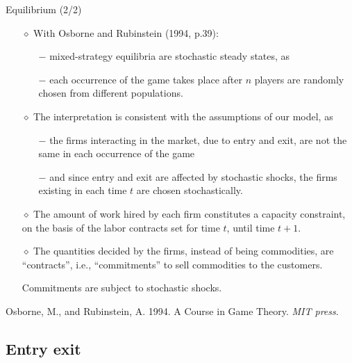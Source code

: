 \documentclass[9pt]{beamer}
\begin{document}
\begin{frame}{Equilibrium (2/2)}

\begin{itemize}

\item[$\diamond$] With Osborne and Rubinstein (1994, p.39):
\begin{itemize}
\item[$-$] mixed-strategy equilibria are stochastic steady states, as
\item[$-$] each occurrence of the game takes place after $n$ players are randomly chosen from different populations. 
\end{itemize}

\item[$\diamond$] The interpretation is consistent with the assumptions of our model, as 
\begin{itemize}
\item[$-$]  the firms interacting in the market, due to entry and exit, are
not the same in each occurrence of the game

\item[$-$]  and since entry and exit are affected by stochastic shocks, the firms existing in each time $t$ are
chosen stochastically.
\end{itemize}

\item[$\diamond$] The amount of work hired by each firm constitutes a capacity constraint, on the basis
of the labor contracts set for time $t$, until time $t+1$.

\item[$\diamond$] The quantities decided by
the firms, instead of being commodities, are ``contracts'', i.e., ``commitments''
to sell commodities to the customers. 

Commitments are subject to stochastic shocks. 

\end{itemize}

\bigskip
\small
Osborne, M., and Rubinstein, A. 1994. A Course in Game Theory. \emph{MIT press}.

\end{frame}

\subsection{Entry exit}
\end{document}
